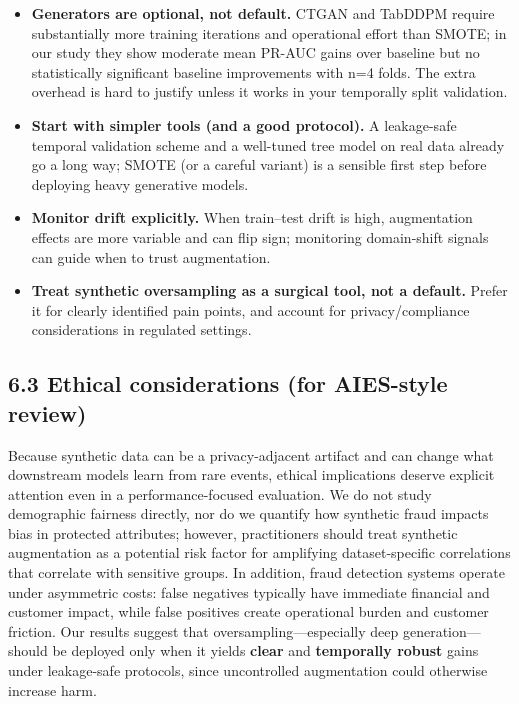 \documentclass[sigconf]{acmart}
\begin{document}
{{{{{{{{\begin{itemize}
\item \textbf{Generators are optional, not default.} CTGAN and TabDDPM require substantially more training iterations and operational effort than SMOTE; in our study they show moderate mean PR-AUC gains over baseline but no statistically significant baseline improvements with n=4 folds. The extra overhead is hard to justify unless it works in your temporally split validation.
\item \textbf{Start with simpler tools (and a good protocol).} A leakage-safe temporal validation scheme and a well-tuned tree model on real data already go a long way; SMOTE (or a careful variant) is a sensible first step before deploying heavy generative models.
\item \textbf{Monitor drift explicitly.} When train--test drift is high, augmentation effects are more variable and can flip sign; monitoring domain-shift signals can guide when to trust augmentation.
\item \textbf{Treat synthetic oversampling as a surgical tool, not a default.} Prefer it for clearly identified pain points, and account for privacy/compliance considerations in regulated settings.

\end{itemize}
\subsection{6.3 Ethical considerations (for AIES-style review)}

Because synthetic data can be a privacy-adjacent artifact and can change what downstream models learn from rare events, ethical implications deserve explicit attention even in a performance-focused evaluation. We do not study demographic fairness directly, nor do we quantify how synthetic fraud impacts bias in protected attributes; however, practitioners should treat synthetic augmentation as a potential risk factor for amplifying dataset-specific correlations that correlate with sensitive groups. In addition, fraud detection systems operate under asymmetric costs: false negatives typically have immediate financial and customer impact, while false positives create operational burden and customer friction. Our results suggest that oversampling---especially deep generation---should be deployed only when it yields \textbf{clear} and \textbf{temporally robust} gains under leakage-safe protocols, since uncontrolled augmentation could otherwise increase harm.

}}}}}}}}
\end{document}
